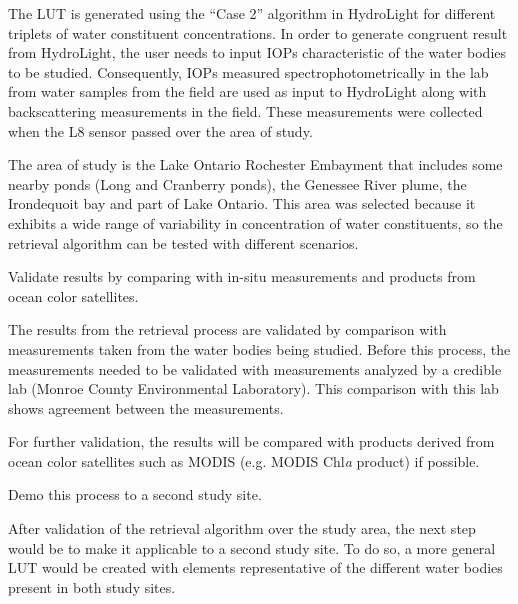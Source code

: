\begin{enumerate}
The LUT is generated using the ``Case 2''  algorithm in HydroLight for different triplets of water constituent concentrations. In order to generate congruent result from HydroLight, the user needs to input IOPs characteristic of the water bodies to be studied. Consequently, IOPs measured spectrophotometrically in the lab from water samples from the field are used as input to HydroLight along with backscattering measurements in the field. These measurements were collected when the L8 sensor passed over the area of study.

The area of study is the Lake Ontario Rochester Embayment that includes some nearby ponds (Long and Cranberry ponds), the Genessee River plume, the Irondequoit bay and part of Lake Ontario. This area was selected because it exhibits a wide range of variability in concentration of water constituents, so the retrieval algorithm can be tested with different scenarios.
 
	{\bf \item Validate results by comparing with in-situ measurements and products from ocean color satellites.}

The results from the retrieval process are validated by comparison with measurements taken from the water bodies being studied. Before this process, the measurements needed to be validated with measurements analyzed by a credible lab (Monroe County Environmental Laboratory). This comparison with this lab shows agreement between the measurements. 

For further validation, the results will be compared with products derived from ocean color satellites such as MODIS (e.g. MODIS Chl{\it a} product) if possible.

	{\bf \item { Demo this process to a second study site}.}

After validation of the retrieval algorithm over the study area, the next step would be to make it applicable to a second study site. To do so, a more general LUT would be created with elements representative of the different water bodies present in both study sites.


\end{enumerate}


